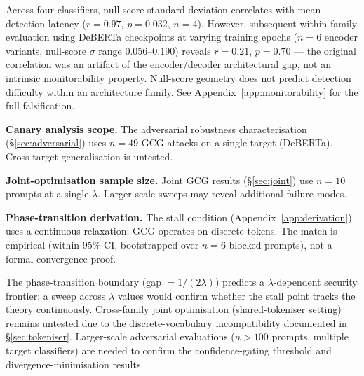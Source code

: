 
Across four classifiers, null score standard deviation correlates with mean detection latency ($r = 0.97$, $p = 0.032$, $n = 4$). However, subsequent within-family evaluation using DeBERTa checkpoints at varying training epochs ($n = 6$ encoder variants, null-score $\sigma$ range 0.056--0.190) reveals $r = 0.21$, $p = 0.70$ --- the original correlation was an artifact of the encoder/decoder architectural gap, not an intrinsic monitorability property. Null-score geometry does not predict detection difficulty within an architecture family. See Appendix~\ref{app:monitorability} for the full falsification.



\item \textbf{Canary analysis scope.} The adversarial robustness characterisation (\S\ref{sec:adversarial}) uses $n = 49$ GCG attacks on a single target (DeBERTa). Cross-target generalisation is untested.
\item \textbf{Joint-optimisation sample size.} Joint GCG results (\S\ref{sec:joint}) use $n = 10$ prompts at a single $\lambda$. Larger-scale sweeps may reveal additional failure modes.
\item \textbf{Phase-transition derivation.} The stall condition (Appendix~\ref{app:derivation}) uses a continuous relaxation; GCG operates on discrete tokens. The match is empirical (within 95\% CI, bootstrapped over $n = 6$ blocked prompts), not a formal convergence proof.



The phase-transition boundary (gap $= 1/(2\lambda)$) predicts a $\lambda$-dependent security frontier; a sweep across $\lambda$ values would confirm whether the stall point tracks the theory continuously. Cross-family joint optimisation (shared-tokeniser setting) remains untested due to the discrete-vocabulary incompatibility documented in \S\ref{sec:tokeniser}. Larger-scale adversarial evaluations ($n > 100$ prompts, multiple target classifiers) are needed to confirm the confidence-gating threshold and divergence-minimisation results.


